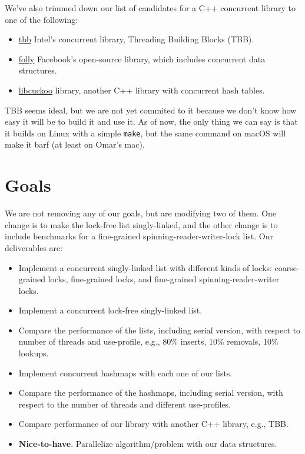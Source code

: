 \documentclass[11pt]{article}
\begin{document}
We've also trimmed down our list of candidates for a C++ concurrent library to one
of the following:

\begin{itemize}
\item
\href{https://github.com/01org/tbb}{tbb} Intel's concurrent library, Threading
Building Blocks (TBB).
\item
\href{https://github.com/facebook/folly}{folly} Facebook's open-source library,
which includes concurrent data structures.
\item
\href{https://github.com/efficient/libcuckoo}{libcuckoo} library, another C++
library with concurrent hash tables.
\end{itemize}

TBB seems ideal, but we are not yet commited to it because we don't know how easy
it will be to build it and use it. As of now, the only thing we can say is that it
builds on Linux with a simple {\tt make}, but the same command on macOS will make
it barf (at least on Omar's mac).

\section*{Goals}
We are not removing any of our goals, but are modifying two of them. One change
is to make the lock-free list singly-linked, and the other change is to include
benchmarks for a fine-grained spinning-reader-writer-lock list. Our deliverables
are:

\begin{itemize}
\item
Implement a concurrent singly-linked list with different kinds of locks:
coarse-grained locks, fine-grained locks, and fine-grained
spinning-reader-writer locks.
\item
Implement a concurrent lock-free singly-linked list.
\item
Compare the performance of the lists, including serial version, with respect to
number of threads and use-profile, e.g., 80\% inserts, 10\% removals, 10\%
lookups.
\item
Implement concurrent hashmaps with each one of our lists.
\item
Compare the performance of the hashmaps, including serial version, with respect
to the number of threads and different use-profiles.
\item
Compare performance of our library with another C++ library, e.g., TBB.
\item
{\bf Nice-to-have}. Parallelize algorithm/problem with our data structures.
\end{itemize}
\end{document}
